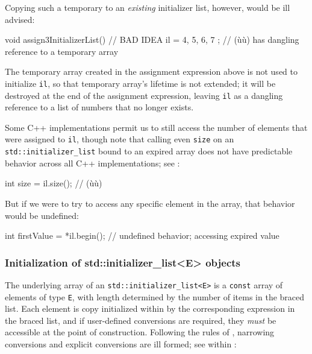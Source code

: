 Copying such a temporary to an \emph{existing} initializer list,
however, would be ill advised:

\begin{emcppslisting}[emcppsbatch=e4]
void assign3InitializerList()  // BAD IDEA
{
    il = { 4, 5, 6, 7 };  // (ù{}ù) has dangling reference to a temporary array
}
\end{emcppslisting}
    

\noindent The temporary array created in the assignment expression above is not
used to initialize \lstinline!il!, so that temporary array's lifetime is
not extended; it will be destroyed at the end of the assignment
expression, leaving \lstinline!il! as a dangling reference to a list of
numbers that no longer exists.

Some C++ implementations permit us to still access the number of
elements that were assigned to \lstinline!il!, though note that calling
even \lstinline!size! on an \lstinline!std::initializer_list! bound to an
expired array does not have predictable behavior across all C++
implementations; see :

\begin{emcppslisting}[emcppsbatch=e4]
int size = il.size();  // (ù{}ù)
\end{emcppslisting}
    

\noindent But if we were to try to access any specific element in the array, that
behavior would be undefined:

\begin{emcppslisting}[emcppsbatch=e4]
int firstValue = *il.begin();  // undefined behavior; accessing expired value
\end{emcppslisting}
    

\subsubsection[Initialization of \lstinline!std::initializer_list<E>! objects]{Initialization of {\SubsubsecCode std::initializer\_list<E>} objects}\label{initialization-of-std::initializer_list<e>-objects}


The underlying array of an \lstinline!std::initializer_list<E>! is a
\lstinline!const! array of elements of type \lstinline!E!, with length
determined by the number of items in the braced list. Each element is
copy initialized  within  
 by the corresponding expression in the braced list,
and if user-defined conversions are required, they \emph{must} be
accessible at the point of construction. Following the rules of
, narrowing conversions and
explicit conversions are ill formed; see  within :

